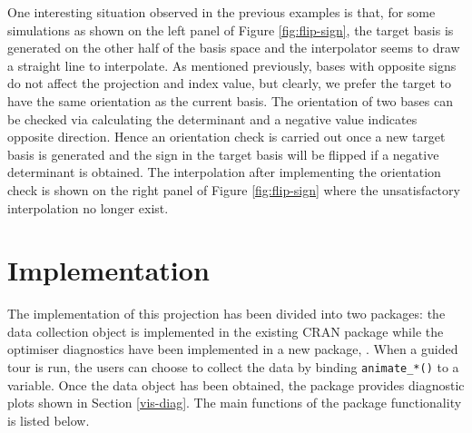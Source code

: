 One interesting situation observed in the previous examples is that, for
some simulations as shown on the left panel of Figure
\ref{fig:flip-sign}, the target basis is generated on the other half of
the basis space and the interpolator seems to draw a straight line to
interpolate. As mentioned previously, bases with opposite signs do not
affect the projection and index value, but clearly, we prefer the target
to have the same orientation as the current basis. The orientation of
two bases can be checked via calculating the determinant and a negative
value indicates opposite direction. Hence an orientation check is
carried out once a new target basis is generated and the sign in the
target basis will be flipped if a negative determinant is obtained. The
interpolation after implementing the orientation check is shown on the
right panel of Figure \ref{fig:flip-sign} where the unsatisfactory
interpolation no longer exist.

\hypertarget{implementation}{%
\section{Implementation}\label{implementation}}

The implementation of this projection has been divided into two
packages: the data collection object is implemented in the existing CRAN
package  \citep{tourr} while the optimiser diagnostics
have been implemented in a new package, . When a guided tour
is run, the users can choose to collect the data by binding
\texttt{animate\_*()} to a variable. Once the data object has been
obtained, the  package provides diagnostic plots shown in
Section \ref{vis-diag}. The main functions of the  package
functionality is listed below.

